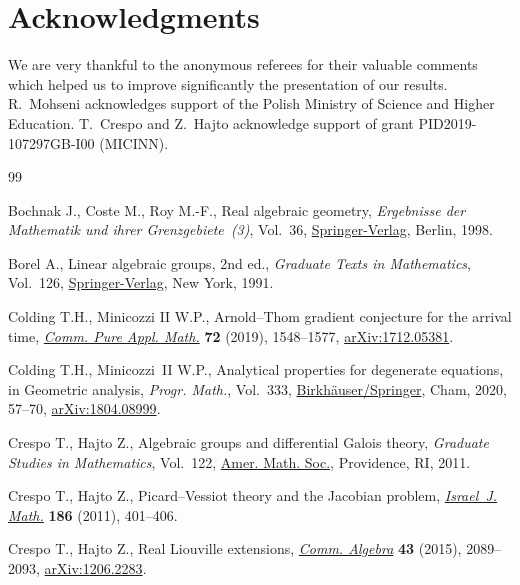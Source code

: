 \documentclass[10pt,a4paper]{amsart}
\numberwithin{equation}{section}
\begin{document}
\section*{Acknowledgments}

We are very thankful to the anonymous referees for their valuable comments which helped us to improve significantly the presentation of our results.
R.~Mohseni acknowledges support of the Polish Ministry of Science and
Higher Education. T.~Crespo and Z.~Hajto acknowledge support of
grant PID2019-107297GB-I00 (MICINN).


\begin{thebibliography}{99}
\footnotesize\itemsep=0pt

Bochnak J., Coste M., Roy M.-F., Real algebraic geometry, \textit{Ergebnisse der
 Mathematik und ihrer Grenzgebiete~(3)}, Vol.~36, \href{https://doi.org/10.1007/978-3-662-03718-8}{Springer-Verlag}, Berlin,
 1998.

Borel A., Linear algebraic groups, 2nd ed., \textit{Graduate Texts in Mathematics}, Vol.~126, \href{https://doi.org/10.1007/978-1-4612-0941-6}{Springer-Verlag}, New York, 1991.

Colding T.H., Minicozzi II W.P., Arnold--{T}hom gradient conjecture for the
 arrival time, \href{https://doi.org/10.1002/cpa.21824}{\textit{Comm. Pure Appl. Math.}} \textbf{72} (2019), 1548--1577,
 \href{https://arxiv.org/abs/1712.05381}{arXiv:1712.05381}.

Colding T.H., Minicozzi~II W.P., Analytical properties for degenerate
 equations, in Geometric analysis, \textit{Progr. Math.}, Vol.~333,
 \href{https://doi.org/10.1007/978-3-030-34953-0_4}{Birkh\"auser/Springer}, Cham, 2020, 57--70, \href{https://arxiv.org/abs/1804.08999}{arXiv:1804.08999}.

Crespo T., Hajto Z., Algebraic groups and differential {G}alois theory,
 \textit{Graduate Studies in Mathematics}, Vol.~122, \href{https://doi.org/10.1090/gsm/122}{Amer. Math. Soc.},
 Providence, RI, 2011.

Crespo T., Hajto Z., Picard--{V}essiot theory and the {J}acobian problem,
 \href{https://doi.org/10.1007/s11856-011-0145-y}{\textit{Israel~J. Math.}} \textbf{186} (2011), 401--406.

Crespo T., Hajto Z., Real {L}iouville extensions, \href{https://doi.org/10.1080/00927872.2014.888561}{\textit{Comm. Algebra}}
 \textbf{43} (2015), 2089--2093, \href{https://arxiv.org/abs/1206.2283}{arXiv:1206.2283}.


\end{thebibliography}
\end{document}
